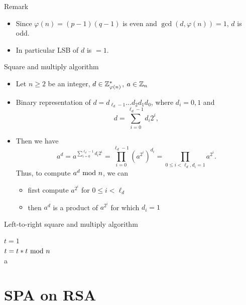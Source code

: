 \begin{frame}{Remark}
    \begin{itemize}
        \item Since $\varphi(n)=(p-1)(q-1)$ is even and $\gcd(d,\varphi(n))=1$, $d$ is odd.
         \item In particular LSB of $d$ is $=1$.
    \end{itemize}
\end{frame}

\begin{frame}{Square and multiply algorithm}
    \begin{itemize}
        \item Let $n\geq2$ be an integer, $d\in{\mathbb Z}_{\varphi(n)}^{*}$, $a\in{\mathbb Z}_n$
        \item Binary representation of $d=d_{\ell_d-1}\dots d_2d_1d_0$, where $d_i=0,1$ and
\[
d=\sum_{i=0}^{\ell_d-1}d_i2^i,
\]
\item Then we have
\[
a^d=a^{\sum_{i=0}^{\ell_d-1}d_i2^i}=\prod_{i=0}^{\ell_d-1}(a^{2^i})^{d_i}=\prod_{0\leq i<\ell_d,d_i=1}a^{2^i}.
\]
Thus, to compute $a^d\textrm{~mod~} n$, we can 
\begin{itemize}
    \item first compute $a^{2^i}$ for $0\leq i<\ell_d$
    \item then $a^d$ is a product of $a^{2^i}$ for which $d_i=1$
\end{itemize}
    \end{itemize}
\end{frame}

\begin{frame}{Left-to-right square and multiply algorithm}
    \begin{algorithm}[H]
$t = 1$\\
 	{
  	$t=t*t\textrm{~mod~} n$\\
  	}
  	\Return a
\caption{Left-to-right square and multiply algorithm for computing modular exponentiation.}
\end{algorithm}
\end{frame}

\section{SPA on RSA}
\begin{frame}{\VideoName}
    \tableofcontents[currentsection]
\end{frame}

